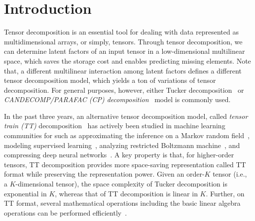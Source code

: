 \section{Introduction}

Tensor decomposition is an essential tool for dealing with data
represented as multidimensional arrays, or simply, tensors. Through
tensor decomposition, we can determine latent factors of an input
tensor in a low-dimensional multilinear space, which saves the storage
cost and enables predicting missing elements. Note that, a different
multilinear interaction among latent factors defines a different
tensor decomposition model, which yields a ton of variations of tensor
decomposition. For general purposes, however, either Tucker
decomposition~\cite{tucker1966some} or \emph{CANDECOMP/PARAFAC (CP)
  decomposition}~\cite{harshman1970foundations} model is commonly
used.

In the past three years, an alternative tensor decomposition model,
called \emph{tensor train (TT)}
decomposition~\cite{oseledets2011tensor} has actively been studied in
machine learning communities for such as approximating the inference
on a Markov random field~\cite{novikov2014putting}, modeling
supervised learning~\cite{novikov2016exponential, NIPS2016_6211},
analyzing restricted Boltzmann machine~\cite{chen2017equivalence}, and
compressing deep neural networks~\cite{novikov2015tensorizing}.
A key property is that, for higher-order tensors, TT decomposition
provides more space-saving representation called TT format while
preserving the representation power. Given an order-$K$ tensor (i.e., a
$K$-dimensional tensor), the space complexity of Tucker decomposition
is exponential in $K$, whereas that of TT decomposition is linear
in $K$. Further, on TT format, several mathematical
operations including the basic linear algebra operations can be performed
efficiently~\cite{oseledets2011tensor}.


%

